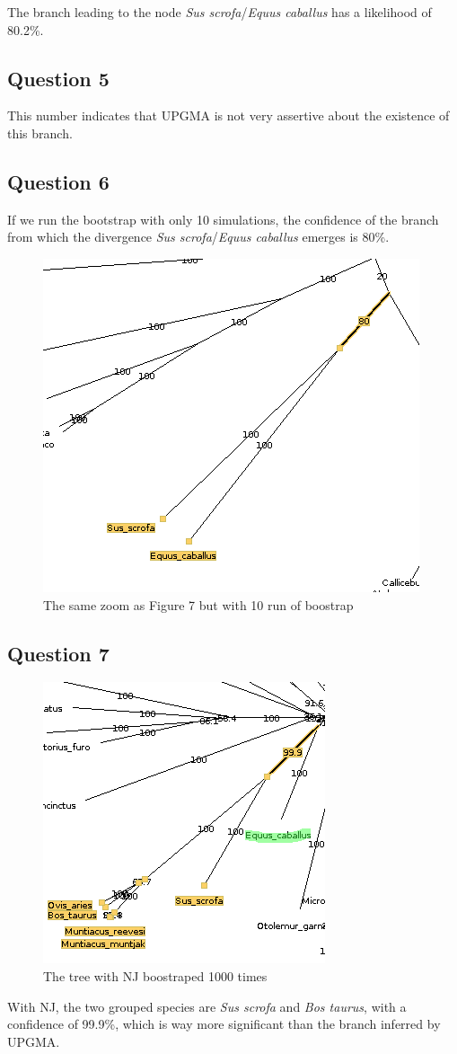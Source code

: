 \documentclass[]{article}
\theoremstyle{definition}
\begin{document}
The branch leading to the node \textit{Sus scrofa}/\textit{Equus caballus} has a likelihood of 80.2\%.

\subsection{Question 5}
This number indicates that UPGMA is not very assertive about the existence of this branch.

\subsection{Question 6}
If we run the bootstrap with only 10 simulations, the confidence of the branch from which the divergence \textit{Sus scrofa}/\textit{Equus caballus} emerges is 80\%.

 \begin{figure}[H]
	\centering
	\includegraphics*[scale=0.8]{image/ex3qt6.png}
	\caption{ The same zoom as Figure 7 but with 10 run of boostrap }
\end{figure}

\subsection{Question 7}

 \begin{figure}[H]
	\centering
	\includegraphics*[scale=0.8]{image/ex3qt7.png}
	\caption{ The tree with NJ boostraped 1000 times }
\end{figure}

With NJ, the two grouped species are \textit{Sus scrofa} and \textit{Bos taurus}, with a confidence of 99.9\%, which is way more significant than the branch inferred by UPGMA.
\end{document}
